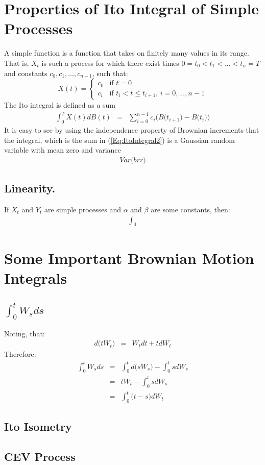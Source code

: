 \section{Properties of Ito Integral of Simple Processes}
A simple function is a function that takes on finitely many values in its range.\\
That is, $X_{t}$ is such a process for which there exist times $0 = t_{0} < t_{1} < ... < t_{n} = T$ and constants $c_{0}, c_{1}, ..., c_{n - 1}$, such that:
\begin{equation}
	X(t) = \begin{cases}
	c_{0} & \text{if $t = 0$}\\
	c_{i} & \text{if $t_{i} < t \leq t_{i + 1}$, $i = 0, ..., n - 1$}
	\end{cases}
\end{equation}
The Ito integral is defined as a sum
\begin{eqnarray}
	\label{Eq:ItoIntegral2}
	\int_{0}^{T}X(t)dB(t) &=& \sum_{i = 0}^{n - 1}c_{i}\Big(B\big(t_{i + 1}\big) - B\big(t_{i}\big)\Big)
\end{eqnarray}
It is easy to see by using the independence property of Brownian increments that the integral, which is the sum in (\ref{Eq:ItoIntegral2}) is a Gaussian random variable with mean zero and variance
\begin{eqnarray}
	Var\Bigg(brr\Bigg)
\end{eqnarray} 


\subsection{Linearity.}If $X_{t}$ and $Y_{t}$ are simple processes and $\alpha$ and $\beta$ are some constants, then:
\begin{eqnarray}
	\int_{0}
\end{eqnarray}


\section{Some Important Brownian Motion Integrals}

\subsection{$\int_{0}^{t}W_{s}ds$}
Noting, that:
\begin{eqnarray}
	d\Big(tW_{t}\Big) &=& W_{t}dt + tdW_{t}
\end{eqnarray}
Therefore:
\begin{eqnarray}
	\int_{0}^{t}W_{s}ds &=& \int_{0}^{t}d\Big(sW_{s}\Big) - \int_{0}^{t}sdW_{s}\\
	&=& tW_{t} - \int_{0}^{t}sdW_{s}\\
	&=& \int_{0}^{t}\Big(t - s\Big)dW_{t}
\end{eqnarray}


\subsection{Ito Isometry}

\subsection{CEV Process}